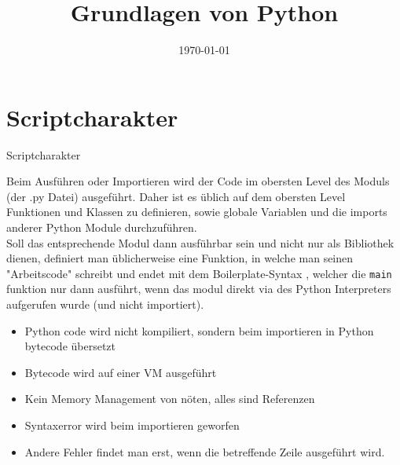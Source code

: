 


\newcommand{\topic}{
	Grundlagen von Python
}

\title{\topic}
\supertitle{\course}
\date{\today}



\maketitle

\begin{frame}
	\tableofcontents
\end{frame}



\section{Scriptcharakter}
\begin{frame}[fragile]{Scriptcharakter}

Beim Ausführen oder Importieren wird der Code im obersten Level des Moduls (der .py Datei) ausgeführt. Daher ist es üblich auf dem obersten Level Funktionen und Klassen zu definieren, sowie globale Variablen und die imports anderer Python Module durchzuführen. \\
Soll das entsprechende Modul dann ausführbar sein und nicht nur als Bibliothek dienen, definiert man üblicherweise eine  Funktion, in welche man seinen
"Arbeitscode" schreibt und endet mit dem Boilerplate-Syntax , welcher die \texttt{main} funktion nur dann ausführt, wenn das modul direkt via des Python Interpreters aufgerufen wurde (und nicht importiert).\\

\begin{itemize}
	\item Python code wird nicht kompiliert, sondern beim importieren in Python bytecode übersetzt
	\item Bytecode wird auf einer VM ausgeführt
	\item Kein Memory Management von nöten, alles sind Referenzen
	\item Syntaxerror wird beim importieren geworfen
	\item Andere Fehler findet man erst, wenn die betreffende Zeile ausgeführt wird.
\end{itemize}


\end{frame}

